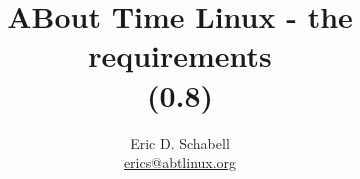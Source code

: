 \documentclass[a4paper]{article}
\begin{document}
\title{ABout Time Linux - the requirements\\ (0.8)}

\author{Eric D. Schabell \\ \url{erics@abtlinux.org}}

\maketitle








  
\end{document}
